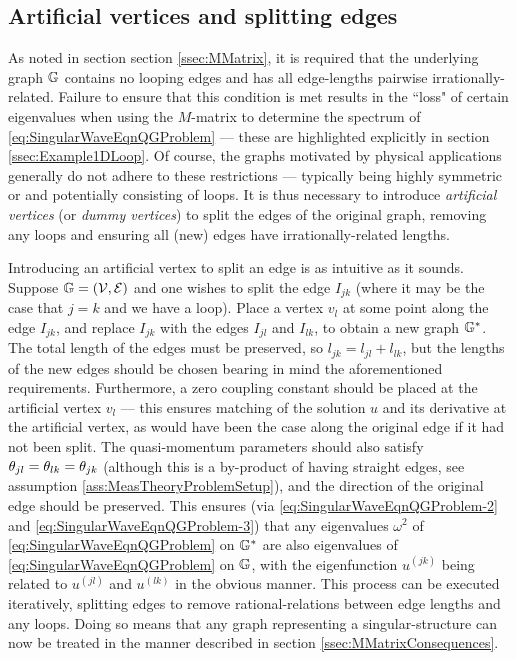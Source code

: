 \subsection{Artificial vertices and splitting edges} \label{ssec:ArtificialVertices}
As noted in section section \ref{ssec:MMatrix}, it is required that the underlying graph $\mathbb{G}$ contains no looping edges and has all edge-lengths pairwise irrationally-related.
Failure to ensure that this condition is met results in the ``loss" of certain eigenvalues when using the $M$-matrix to determine the spectrum of \eqref{eq:SingularWaveEqnQGProblem} --- these are highlighted explicitly in section \ref{ssec:Example1DLoop}.
Of course, the graphs motivated by physical applications generally do not adhere to these restrictions --- typically being highly symmetric or and potentially consisting of loops.
It is thus necessary to introduce \emph{artificial vertices} (or \emph{dummy vertices}) to split the edges of the original graph, removing any loops and ensuring all (new) edges have irrationally-related lengths.

Introducing an artificial vertex to split an edge is as intuitive as it sounds.
Suppose $\mathbb{G}=\left( \mathcal{V}, \mathcal{E} \right)$ and one wishes to split the edge $I_{jk}$ (where it may be the case that $j=k$ and we have a loop).
Place a vertex $v_l$ at some point along the edge $I_{jk}$, and replace $I_{jk}$ with the edges $I_{jl}$ and $I_{lk}$, to obtain a new graph $\mathbb{G}^*$.
The total length of the edges must be preserved, so $l_{jk} = l_{jl} + l_{lk}$, but the lengths of the new edges should be chosen bearing in mind the aforementioned requirements.
Furthermore, a zero coupling constant should be placed at the artificial vertex $v_l$ --- this ensures matching of the solution $u$ and its derivative at the artificial vertex, as would have been the case along the original edge if it had not been split.
The quasi-momentum parameters should also satisfy $\theta_{jl}=\theta_{lk}=\theta_{jk}$ (although this is a by-product of having straight edges, see assumption \ref{ass:MeasTheoryProblemSetup}), and the direction of the original edge should be preserved.
This ensures (via \eqref{eq:SingularWaveEqnQGProblem-2} and \eqref{eq:SingularWaveEqnQGProblem-3}) that any eigenvalues $\omega^2$ of \eqref{eq:SingularWaveEqnQGProblem} on $\mathbb{G}^*$ are also eigenvalues of \eqref{eq:SingularWaveEqnQGProblem} on $\mathbb{G}$, with the eigenfunction $u^{(jk)}$ being related to $u^{(jl)}$ and $u^{(lk)}$ in the obvious manner.
This process can be executed iteratively, splitting edges to remove rational-relations between edge lengths and any loops.
Doing so means that any graph representing a singular-structure can now be treated in the manner described in section \ref{ssec:MMatrixConsequences}.

